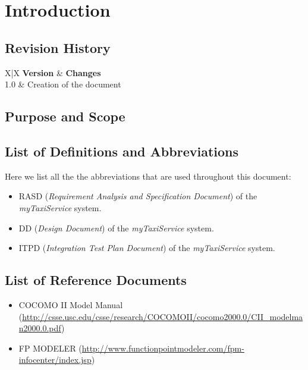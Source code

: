 \section{Introduction} %
\label{sec:introduction}

\subsection{Revision History} %
\label{sub:revision_history}
\begin{tabularx}{\textwidth}{ X|X }
	\textbf{Version} & \textbf{Changes} \\ \hline
	 {1.0} & Creation of the document \\
\end{tabularx}

\subsection{Purpose and Scope} %
\label{sub:purpose_and_scope}


\subsection{List of Definitions and Abbreviations} %
\label{sub:definitions_and_abbreviations}
Here we list all the the abbreviations that are used throughout this document:
\begin{itemize}
	\item RASD (\emph{Requirement Analysis and Specification Document}) of the \emph{myTaxiService} system.
	\item DD (\emph{Design Document}) of the \emph{myTaxiService} system.
	\item ITPD (\emph{Integration Test Plan Document}) of the \emph{myTaxiService} system.
\end{itemize}

\subsection{List of Reference Documents} %
\label{sub:reference_documents}
\begin{itemize}
	\item COCOMO II Model Manual (\url{http://csse.usc.edu/csse/research/COCOMOII/cocomo2000.0/CII_modelman2000.0.pdf})
	\item FP MODELER (\url{http://www.functionpointmodeler.com/fpm-infocenter/index.jsp})
\end{itemize}
